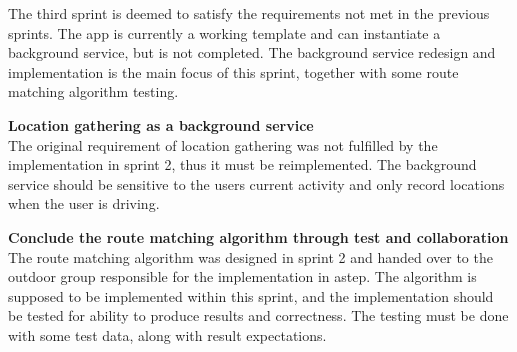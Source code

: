 The third sprint is deemed to satisfy the requirements not met in the previous sprints.
The app is currently a working template and can instantiate a background service, but is not completed. 
The background service redesign and implementation is the main focus of this sprint, together with some route matching algorithm testing.

\textbf{Location gathering as a background service}\\
The original requirement of location gathering was not fulfilled by the implementation in sprint 2, thus it must be reimplemented.
The background service should be sensitive to the users current activity and only record locations when the user is driving.

\textbf{Conclude the route matching algorithm through test and collaboration}\\
The route matching algorithm was designed in sprint 2 and handed over to the outdoor group responsible for the implementation in \gls{astep}.
The algorithm is supposed to be implemented within this sprint, and the implementation should be tested for ability to produce results and correctness.
The testing must be done with some test data, along with result expectations.